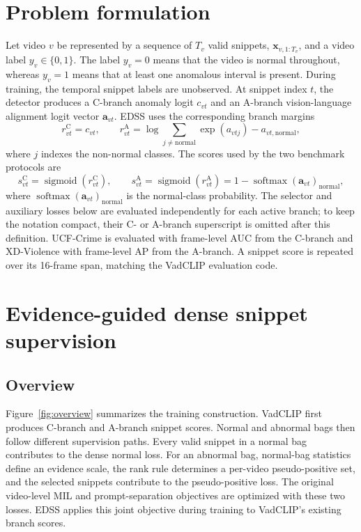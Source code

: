 \documentclass[preprint,12pt]{elsarticle}
\begin{document}
\section{Problem formulation}
\label{sec:problem}

Let video $v$ be represented by a sequence of $T_v$ valid snippets, $\bm{x}_{v,1:T_v}$, and a video label $y_v\in\{0,1\}$. The label $y_v=0$ means that the video is normal throughout, whereas $y_v=1$ means that at least one anomalous interval is present. During training, the temporal snippet labels are unobserved. At snippet index $t$, the detector produces a C-branch anomaly logit $c_{vt}$ and an A-branch vision-language alignment logit vector $\bm{a}_{vt}$. EDSS uses the corresponding branch margins
\begin{equation}
    r^{\mathrm{C}}_{vt}=c_{vt}, \qquad
    r^{\mathrm{A}}_{vt}=\log\sum_{j\neq\mathrm{normal}}\exp(a_{vtj})-a_{vt,\mathrm{normal}},
\end{equation}
where $j$ indexes the non-normal classes. The scores used by the two benchmark protocols are
\begin{equation}
    s^{\mathrm{C}}_{vt}=\operatorname{sigmoid}(r^{\mathrm{C}}_{vt}), \qquad
    s^{\mathrm{A}}_{vt}=\operatorname{sigmoid}(r^{\mathrm{A}}_{vt})
    =1-\operatorname{softmax}(\bm{a}_{vt})_{\mathrm{normal}},
\end{equation}
where $\operatorname{softmax}(\bm{a}_{vt})_{\mathrm{normal}}$ is the normal-class probability. The selector and auxiliary losses below are evaluated independently for each active branch; to keep the notation compact, their C- or A-branch superscript is omitted after this definition. UCF-Crime is evaluated with frame-level AUC from the C-branch and XD-Violence with frame-level AP from the A-branch. A snippet score is repeated over its 16-frame span, matching the VadCLIP evaluation code.

\section{Evidence-guided dense snippet supervision}
\label{sec:method}

\subsection{Overview}
Figure~\ref{fig:overview} summarizes the training construction. VadCLIP first produces C-branch and A-branch snippet scores. Normal and abnormal bags then follow different supervision paths. Every valid snippet in a normal bag contributes to the dense normal loss. For an abnormal bag, normal-bag statistics define an evidence scale, the rank rule determines a per-video pseudo-positive set, and the selected snippets contribute to the pseudo-positive loss. The original video-level MIL and prompt-separation objectives are optimized with these two losses. EDSS applies this joint objective during training to VadCLIP's existing branch scores.
\end{document}
